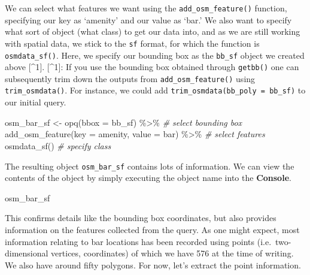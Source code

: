 \documentclass[
]{book}
\newenvironment{Shaded}{\begin{snugshade}}{\end{snugshade}}
\newcommand{\AttributeTok}[1]{\textcolor[rgb]{0.77,0.63,0.00}{#1}}
\newcommand{\CommentTok}[1]{\textcolor[rgb]{0.56,0.35,0.01}{\textit{#1}}}
\newcommand{\FunctionTok}[1]{\textcolor[rgb]{0.00,0.00,0.00}{#1}}
\newcommand{\NormalTok}[1]{#1}
\newcommand{\OtherTok}[1]{\textcolor[rgb]{0.56,0.35,0.01}{#1}}
\newcommand{\SpecialCharTok}[1]{\textcolor[rgb]{0.00,0.00,0.00}{#1}}
\newcommand{\StringTok}[1]{\textcolor[rgb]{0.31,0.60,0.02}{#1}}
\begin{document}
We can select what features we want using the \texttt{add\_osm\_feature()} function, specifying our key as `amenity' and our value as `bar.' We also want to specify what sort of object (what class) to get our data into, and as we are still working with spatial data, we stick to the \texttt{sf} format, for which the function is \texttt{osmdata\_sf()}. Here, we specify our bounding box as the \texttt{bb\_sf} object we created above {[}\^{}1{]}. {[}\^{}1{]}: If you use the bounding box obtained through \texttt{getbb()} one can subsequently trim down the outputs from \texttt{add\_osm\_feature()} using \texttt{trim\_osmdata()}. For instance, we could add \texttt{trim\_osmdata(bb\_poly\ =\ bb\_sf)} to our initial query.

\begin{Shaded}
\begin{Highlighting}[]
\NormalTok{osm\_bar\_sf }\OtherTok{\textless{}{-}} \FunctionTok{opq}\NormalTok{(}\AttributeTok{bbox =}\NormalTok{ bb\_sf) }\SpecialCharTok{\%\textgreater{}\%}                               \CommentTok{\# select bounding box}
  \FunctionTok{add\_osm\_feature}\NormalTok{(}\AttributeTok{key =} \StringTok{\textquotesingle{}amenity\textquotesingle{}}\NormalTok{, }\AttributeTok{value =} \StringTok{\textquotesingle{}bar\textquotesingle{}}\NormalTok{) }\SpecialCharTok{\%\textgreater{}\%} \CommentTok{\# select features}
  \FunctionTok{osmdata\_sf}\NormalTok{()                                                     }\CommentTok{\# specify class}
\end{Highlighting}
\end{Shaded}

The resulting object \texttt{osm\_bar\_sf} contains lots of information. We can view the contents of the object by simply executing the object name into the \textbf{Console}.

\begin{Shaded}
\begin{Highlighting}[]
\NormalTok{osm\_bar\_sf}
\end{Highlighting}
\end{Shaded}

This confirms details like the bounding box coordinates, but also provides information on the features collected from the query. As one might expect, most information relating to bar locations has been recorded using points (i.e.~two-dimensional vertices, coordinates) of which we have 576 at the time of writing. We also have around fifty polygons. For now, let's extract the point information.
\end{document}

